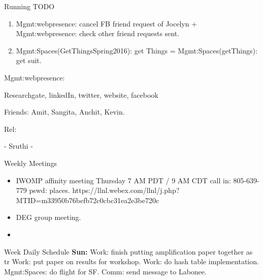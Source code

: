 \documentclass[serif, mathserif, final]{beamer}
\begin{document}
\begin{frame}
\begin{columns}
\begin{column}{0.5\linewidth}
\begin{block}{Running TODO}
\begin{enumerate}
        \item \tiny Mgmt:webpresence: cancel FB friend request of
          Jocelyn + Mgmt:webpresence: check other friend requests
          sent. 

        \item \tiny Mgmt:Spaces(GetThingsSpring2016): get Things =
          Mgmt:Spaces(getThings): get suit. 

        \end{enumerate}        
      \end{block}

\begin{block} 

Mgmt:webpresence: 

Researchgate, linkedIn, twitter, website, facebook 

Friends: Amit, Sangita, Anchit, Kevin. 

Rel: 

- Sruthi 
- 

\end{block}

\begin{block}{Weekly Meetings} 
  \begin{itemize} 
  \item \tiny IWOMP affinity meeting Thursday 7 AM PDT / 9 AM
    CDT call in: 805-639-779 pswd: places. 
    https://llnl.webex.com/llnl/j.php?MTID=m33950b76befb72c0cbc31ea2e3be720c  
  \item \tiny DEG group meeting. 
  \item \tiny 
  \end{itemize}
  
  \begin{block} {Week Daily Schedule} 
    {\bf Sun:}
     Work: finish putting amplification paper
    together as tr 
    Work: put paper on results for workshop. 
    Work: do hash table implementation. 
    Mgmt:Spaces: do flight for SF. 
    Comm: send message to Labonee. 
\end{block} 

\begin{column}{0.25\linewidth}


\end{column}
\end{block}
\end{column}
\end{columns}
\end{frame}
\end{document}
